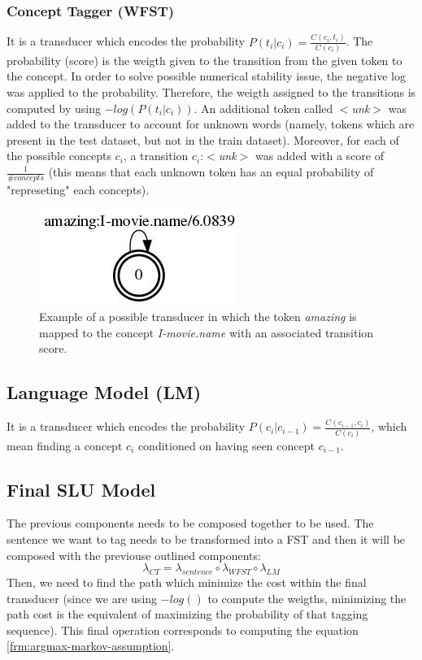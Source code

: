 \documentclass[11pt,a4paper]{article}
\begin{document}
\subsubsection{Concept Tagger (WFST)}
It is a transducer which encodes the probability $P(t_i|c_i) = \frac{C(c_i, t_i)}{C(c_i)}$. The probability (score) is the weigth given to the transition from the given token to the concept. In order to solve possible numerical stability issue, the negative log was applied to the probability. Therefore, the weigth assigned to the transitions is computed by using $-log(P(t_i|c_i))$. An additional token called $<$\textit{unk}$>$ was added to the transducer to account for unknown words (namely, tokens which are present in the test dataset, but not in the train dataset). Moreover, for each of the possible concepts $c_i$, a transition $c_i$:$<$\textit{unk}$>$ was added with a score of $\frac{1}{\#concepts}$ (this means that each unknown token has an equal probability of "represeting" each concepts). 
\begin{figure}[b!]
	\centering
	\includegraphics[width=0.5\linewidth]{img/pos-tagger}
	\caption{Example of a possible transducer in which the token \textit{amazing} is mapped to the concept \textit{I-movie.name} with an associated transition score.}
\end{figure}

\subsection{Language Model (LM)}
It is a transducer which encodes the probability $P(c_i|c_{i-1}) = \frac{C(c_{i-1}, c_i)}{C(c_i)}$, which mean finding a concept $c_i$ conditioned on having seen concept $c_{i-1}$. 

\subsection{Final SLU Model}

The previous components needs to be composed together to be used. The sentence we want to tag needs to be transformed into a FST and then it will be composed with the previouse outlined components:
\begin{equation}
\lambda_{CT} = \lambda_{sentence} \circ \lambda_{WFST} \circ \lambda_{LM}
\end{equation}
Then, we need to find the path which minimize the cost within the final transducer (since we are using $-log()$ to compute the weigths, minimizing the path cost is the equivalent of maximizing the probability of that tagging sequence). This final operation corresponds to computing the equation \ref{frm:argmax-markov-assumption}.
\end{document}
